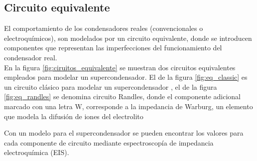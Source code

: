 \subsection{Circuito equivalente}
El comportamiento de los condensadores reales (convencionales o electroquímicos), son modelados por un circuito equivalente, donde se introducen componentes que representan las imperfecciones del funcionamiento del condensador real.\\
En la figura \ref{fig:ciruitos_equivalente} se muestran dos circuitos equivalentes empleados para modelar un supercondensador. El de la figura \ref{fig:eq_classic} es un circuito clásico para modelar un supercondensador \citep{Spyker2000}, el de la figura \ref{fig:eq_randles} se denomina circuito Randles, donde el componente adicional marcado con una  letra W, corresponde a la impedancia de Warburg, un elemento que modela la difusión de iones del electrolito \citep{Wang2009}

Con un modelo para el supercondensador se pueden encontrar los valores para cada componente de circuito mediante espectroscopía de impedancia electroquímica (EIS).

